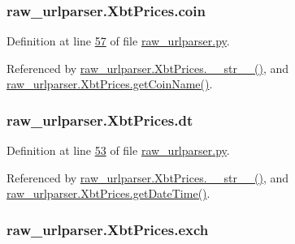 \subsubsection[{\texorpdfstring{coin}{coin}}]{\setlength{\rightskip}{0pt plus 5cm}raw\+\_\+urlparser.\+Xbt\+Prices.\+coin}\hypertarget{classraw__urlparser_1_1_xbt_prices_a8d253ccd987bce28e3aaba7a9c486e5f}{}\label{classraw__urlparser_1_1_xbt_prices_a8d253ccd987bce28e3aaba7a9c486e5f}


Definition at line \hyperlink{raw__urlparser_8py_source_l00057}{57} of file \hyperlink{raw__urlparser_8py_source}{raw\+\_\+urlparser.\+py}.



Referenced by \hyperlink{raw__urlparser_8py_source_l00074}{raw\+\_\+urlparser.\+Xbt\+Prices.\+\_\+\+\_\+str\+\_\+\+\_\+()}, and \hyperlink{raw__urlparser_8py_source_l00071}{raw\+\_\+urlparser.\+Xbt\+Prices.\+get\+Coin\+Name()}.

\subsubsection[{\texorpdfstring{dt}{dt}}]{\setlength{\rightskip}{0pt plus 5cm}raw\+\_\+urlparser.\+Xbt\+Prices.\+dt}\hypertarget{classraw__urlparser_1_1_xbt_prices_ae094aa3e73d21d0be219a085f09bcf13}{}\label{classraw__urlparser_1_1_xbt_prices_ae094aa3e73d21d0be219a085f09bcf13}


Definition at line \hyperlink{raw__urlparser_8py_source_l00053}{53} of file \hyperlink{raw__urlparser_8py_source}{raw\+\_\+urlparser.\+py}.



Referenced by \hyperlink{raw__urlparser_8py_source_l00074}{raw\+\_\+urlparser.\+Xbt\+Prices.\+\_\+\+\_\+str\+\_\+\+\_\+()}, and \hyperlink{raw__urlparser_8py_source_l00059}{raw\+\_\+urlparser.\+Xbt\+Prices.\+get\+Date\+Time()}.

\subsubsection[{\texorpdfstring{exch}{exch}}]{\setlength{\rightskip}{0pt plus 5cm}raw\+\_\+urlparser.\+Xbt\+Prices.\+exch}\hypertarget{classraw__urlparser_1_1_xbt_prices_a016bbd95465aaa14b5c434047df7b7fb}{}\label{classraw__urlparser_1_1_xbt_prices_a016bbd95465aaa14b5c434047df7b7fb}


